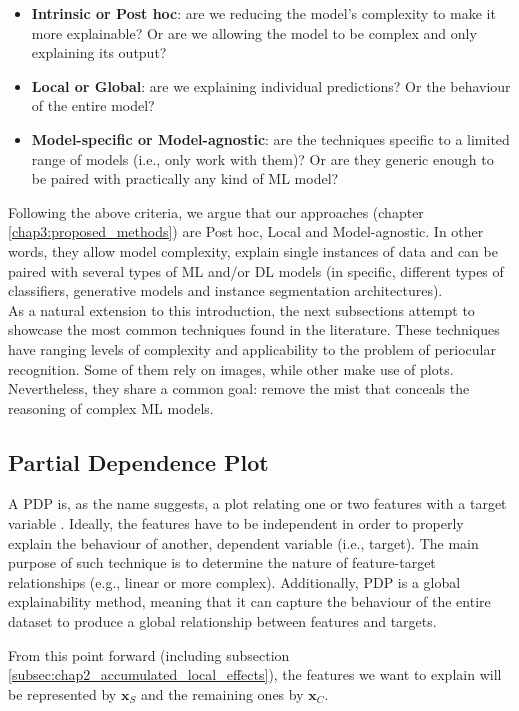 \begin{itemize}
    \item \textbf{Intrinsic or Post hoc}: are we reducing the model's complexity to make it more explainable? Or are we allowing the model to be complex and only explaining its output?
    \item \textbf{Local or Global}: are we explaining individual predictions? Or the behaviour of the entire model?
    \item \textbf{Model-specific or Model-agnostic}: are the techniques specific to a limited range of models (i.e., only work with them)? Or are they generic enough to be paired with practically any kind of \ac{ML} model?
\end{itemize}

Following the above criteria, we argue that our approaches (chapter \ref{chap3:proposed_methods}) are Post hoc, Local and Model-agnostic. In other words, they allow model complexity, explain single instances of data and can be paired with several types of \ac{ML} and/or \ac{DL} models (in specific, different types of classifiers, generative models and instance segmentation architectures).\\

As a natural extension to this introduction, the next subsections attempt to showcase the most common techniques found in the literature. These techniques have ranging levels of complexity and applicability to the problem of periocular recognition. Some of them rely on images, while other make use of plots. Nevertheless, they share a common goal: remove the mist that conceals the reasoning of complex \ac{ML} models. 

\subsection{Partial Dependence Plot}
\label{subsec:chap2_partial_dependence_plot}
A \ac{PDP} is, as the name suggests, a plot relating one or two features with a target variable \cite{pdp}. Ideally, the features have to be independent in order to properly explain the behaviour of another, dependent variable (i.e., target). The main purpose of such technique is to determine the nature of feature-target relationships (e.g., linear or more complex). Additionally, \ac{PDP} is a global explainability method, meaning that it can capture the behaviour of the entire dataset to produce a global relationship between features and targets.

From this point forward (including subsection \ref{subsec:chap2_accumulated_local_effects}), the features we want to explain will be represented by $\mathbf{x}_{S}$ and the remaining ones by $\mathbf{x}_{C}$.\\

